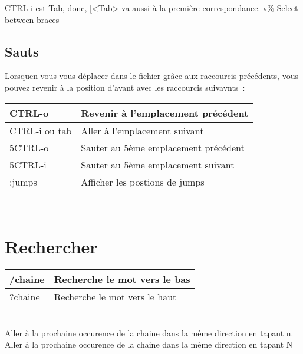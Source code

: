 \documentclass{article}
\begin{document}
                        CTRL-i est Tab, donc, [<Tab> va aussi à la première correspondance. 
                            v\% Select between braces

                            \subsection{Sauts}
                            Lorsquen vous vous déplacer dans le fichier grâce aux raccourcis précédents, vous pouvez revenir à la position d'avant avec les raccourcis suivavnts~: \\


                            \begin{tabular}{|p{3cm}| l| }
                                \hline
                                CTRL-o & Revenir à l'emplacement précédent\\ \hline
                                CTRL-i ou tab & Aller à l'emplacement suivant\\ \hline
                                5CTRL-o & Sauter au 5ème emplacement précédent\\ \hline
                                5CTRL-i & Sauter au 5ème emplacement suivant\\ \hline
                                :jumps & Afficher les postions de jumps\\ \hline
                            \end{tabular}\\

                            \section{Rechercher}
                            \begin{tabular}{|p{3cm}| l| }
                                \hline
                                /chaine & Recherche le mot vers le bas\\ \hline
                                ?chaine & Recherche le mot vers le haut\\ \hline
                            \end{tabular}\\

                            \noindent
                            Aller à la prochaine occurence de la chaine dans la même direction en tapant n.\\
                            Aller à la prochaine occurence de la chaine dans la même direction en tapant N
\end{document}
